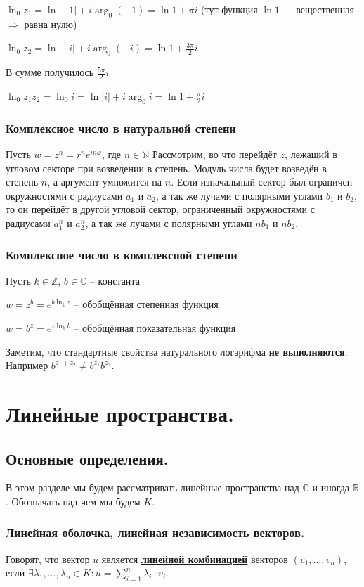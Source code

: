 \documentclass[twoside]{book}
\newcommand{\deff}[1]{\underline{\textbf{#1}}}
\begin{document}
$\ln_0{z_1}=\ln{|-1|}+i\arg_0{(-1)}=\ln{1} + \pi i$ (тут функция $\ln{1}$ --- вещественная $\Rightarrow$ равна нулю)

$\ln_0{z_2}=\ln{|-i|}+i\arg_0{(-i)}=\ln{1} + \frac{3\pi}{2} i$

В сумме получилось $\frac{5\pi}{2}i$

$\ln_0{z_1z_2}=\ln_0{i}=\ln{|i|} + i\arg_0{i} = \ln{1} + \frac{\pi}{2}i$

\subsubsection{Комплексное число в натуральной степени}
Пусть $w=z^n=r^ne^{in\varphi}$, где $n\in\mathbb{N}$
Рассмотрим, во что перейдёт $z$, лежащий в угловом секторе при возведении в степень. Модуль числа будет возведён в степень $n$, а аргумент умножится на $n$. Если изначальный сектор был ограничен окружностями с радиусами $a_1$ и $a_2$, а так же лучами с полярными углами $b_1$ и $b_2$, то он перейдёт в другой угловой сектор, ограниченный окружностями с радиусами $a_1^n$ и $a_2^n$, а так же лучами с полярными углами $nb_1$ и $nb_2$.

\subsubsection{Комплексное число в комплексной степени}
Пусть $k\in\mathbb{Z}$, $b\in\mathbb{C}$ -- константа

$w=z^b=e^{b\ln_k{z}}$ -- обобщённая степенная функция

$w=b^z=e^{z\ln_k{b}}$ -- обобщённая показательная функция

Заметим, что стандартные свойства натурального логарифма \textbf{не выполняются}. Например $b^{z_1 + z_2} \neq b^{z_1} b^{z_2}$.

\section{Линейные пространства.}
\subsection{Основные определения.}
В этом разделе мы будем рассматривать линейные пространства над $\mathbb C$ и иногда $\mathbb R$.  Обозначать над чем мы будем $K$.
\subsubsection{Линейная оболочка, линейная независимость векторов.}
Говорят, что вектор $u$ является \deff{линейной комбинацией} векторов $(v_1,\ldots,v_n)$, если  $\exists \lambda_1,\ldots,\lambda_n \in K : u=\sum\limits_{i=1}^n\lambda_i\cdot v_i$.
\end{document}
